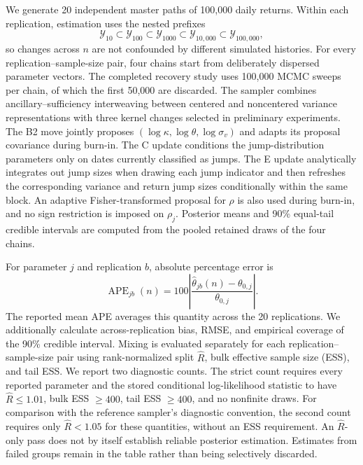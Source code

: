 We generate 20 independent master paths of 100,000 daily returns. Within each
replication, estimation uses the nested prefixes
\begin{equation}
\mathcal{Y}_{10}\subset\mathcal{Y}_{100}
\subset\mathcal{Y}_{1000}\subset\mathcal{Y}_{10{,}000}
\subset\mathcal{Y}_{100{,}000},
\end{equation}
so changes across $n$ are not confounded by different simulated histories.
For every replication--sample-size pair, four chains start from deliberately
dispersed parameter vectors. {\color{red}The completed recovery study uses
100,000 MCMC sweeps per chain, of which the first 50,000 are discarded.}
The sampler combines
ancillary--sufficiency interweaving between centered and noncentered variance
representations with three kernel changes selected in preliminary experiments.
The B2 move jointly proposes $(\log\kappa,\log\theta,\log\sigma_v)$ and adapts
its proposal covariance during burn-in.  The C update conditions the
jump-distribution parameters only on dates currently classified as jumps.  The
E update analytically integrates out jump sizes when drawing each jump
indicator and then refreshes the corresponding variance and return jump sizes
conditionally within the same block.  An adaptive Fisher-transformed proposal
for $\rho$ is also used during burn-in, and no sign restriction is imposed on
$\rho_j$.  Posterior means and 90\% equal-tail credible intervals are computed
from the pooled retained draws of the four chains.

For parameter $j$ and replication $b$, absolute percentage error is
\begin{equation}
\operatorname{APE}_{jb}(n)
=100\left|\frac{\widehat\theta_{jb}(n)-\theta_{0,j}}
{\theta_{0,j}}\right|.
\label{eq:p_parameter_ape}
\end{equation}
The reported mean APE averages this quantity across the 20 replications.
We additionally calculate across-replication bias, RMSE, and empirical coverage
of the 90\% credible interval.  Mixing is evaluated separately for each
replication--sample-size pair using rank-normalized split $\widehat R$, bulk
effective sample size (ESS), and tail ESS. We report two diagnostic counts.
The strict count requires every reported parameter and the stored conditional
log-likelihood statistic to have $\widehat R\leq1.01$, bulk ESS $\geq400$,
tail ESS $\geq400$, and no nonfinite draws. For comparison with the reference
sampler's diagnostic convention, the second count requires only
$\widehat R<1.05$ for these quantities, without an ESS requirement. An
$\widehat R$-only pass does not by itself establish reliable posterior
estimation. Estimates from failed groups remain in the table rather than
being selectively discarded.

